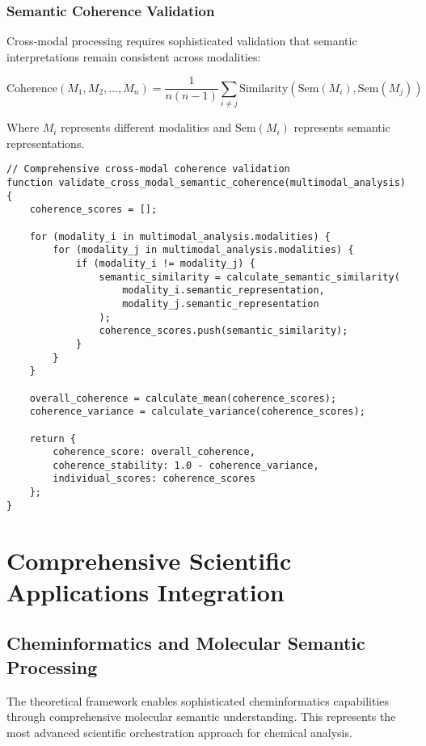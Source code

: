 \documentclass[12pt,a4paper,twoside]{article}
\begin{document}
\subsubsection{Semantic Coherence Validation}

Cross-modal processing requires sophisticated validation that semantic interpretations remain consistent across modalities:

\begin{equation}
\text{Coherence}(M_1, M_2, ..., M_n) = \frac{1}{n(n-1)} \sum_{i \neq j} \text{Similarity}(\text{Sem}(M_i), \text{Sem}(M_j))
\end{equation}

Where $M_i$ represents different modalities and $\text{Sem}(M_i)$ represents semantic representations.

\begin{lstlisting}[caption=Cross-Modal Semantic Coherence Validation]
// Comprehensive cross-modal coherence validation
function validate_cross_modal_semantic_coherence(multimodal_analysis) {
    coherence_scores = [];

    for (modality_i in multimodal_analysis.modalities) {
        for (modality_j in multimodal_analysis.modalities) {
            if (modality_i != modality_j) {
                semantic_similarity = calculate_semantic_similarity(
                    modality_i.semantic_representation,
                    modality_j.semantic_representation
                );
                coherence_scores.push(semantic_similarity);
            }
        }
    }

    overall_coherence = calculate_mean(coherence_scores);
    coherence_variance = calculate_variance(coherence_scores);

    return {
        coherence_score: overall_coherence,
        coherence_stability: 1.0 - coherence_variance,
        individual_scores: coherence_scores
    };
}
\end{lstlisting}

\section{Comprehensive Scientific Applications Integration}

\subsection{Cheminformatics and Molecular Semantic Processing}

The theoretical framework enables sophisticated cheminformatics capabilities through comprehensive molecular semantic understanding. This represents the most advanced scientific orchestration approach for chemical analysis.
\end{document}
